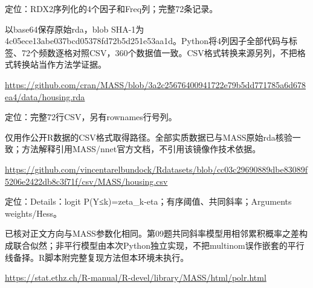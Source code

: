 \par\noindent\begin{minipage}{\linewidth}\raggedright{}\label{src:G3-HOUSING-DATA}
\par
定位：RDX2序列化的4个因子和Freq列；完整72条记录。\par
以base64保存原始rda，blob SHA-1为4c05ece13abe037bcd05378fd72b5d251e53aa1d。Python将4列因子全部代码与标签、72个频数逐格对照CSV，360个数据值一致。CSV格式转换来源另列，不把格式转换站当作方法学证据。\par
{\small \url{https://github.com/cran/MASS/blob/3a2c25676400941722e79b5dd771785a6d678ea4/data/housing.rda}}\par
\end{minipage}\par\medskip

\par\noindent\begin{minipage}{\linewidth}\raggedright{}\label{src:G3-HOUSING-CSV}
\par
定位：完整72行CSV，另有rownames行号列。\par
仅用作公开R数据的CSV格式取得路径。全部实质数据已与MASS原始rda核验一致；方法解释引用MASS/nnet官方文档，不引用该镜像作技术依据。\par
{\small \url{https://github.com/vincentarelbundock/Rdatasets/blob/cc03c29690889dbe83089f5206e2422db8c3f71f/csv/MASS/housing.csv}}\par
\end{minipage}\par\medskip

\par\noindent\begin{minipage}{\linewidth}\raggedright{}\label{src:G3-POLR}
\par
定位：Details：logit P(Y≤k)=zeta\_k-eta；有序阈值、共同斜率；Arguments weights/Hess。\par
已核对正文方向与MASS参数化相同。第09题共同斜率模型用相邻累积概率之差构成联合似然；非平行模型由本次Python独立实现，不把multinom误作嵌套的平行线备择。R脚本附完整复现方法但本环境未执行。\par
{\small \url{https://stat.ethz.ch/R-manual/R-devel/library/MASS/html/polr.html}}\par
\end{minipage}\par\medskip

